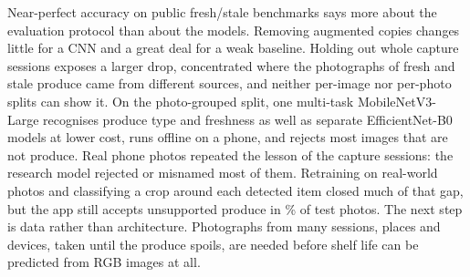 Near-perfect accuracy on public fresh/stale benchmarks says more about the
evaluation protocol than about the models. Removing augmented copies changes
little for a CNN and a great deal for a weak baseline. Holding out whole capture
sessions exposes a larger drop, concentrated where the photographs of fresh and
stale produce came from different sources, and neither per-image nor per-photo
splits can show it. On the photo-grouped split, one multi-task
MobileNetV3-Large recognises produce type and freshness as well as separate
EfficientNet-B0 models at lower cost, runs offline on a phone, and rejects most
images that are not produce. Real phone photos repeated the lesson of the
capture sessions: the research model rejected or misnamed most of them.
Retraining on real-world photos and classifying a crop around each detected
item closed much of that gap, but the app still accepts unsupported produce in
\ScanOodDet\% of test photos. The next step is data rather than architecture.
Photographs from many sessions, places and devices, taken until the produce
spoils, are needed before shelf life can be predicted from RGB images at all.
